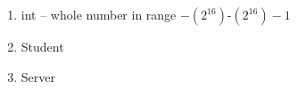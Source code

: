\begin{enumerate}
	\item int -- whole number in range $-(2^16)$-$(2^16)-1$
	\item Student
	\item Server
\end{enumerate}
